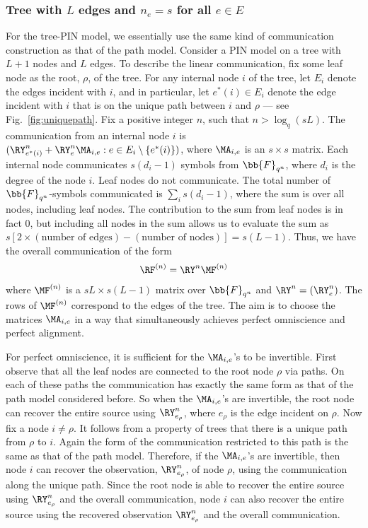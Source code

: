 \subsubsection{Tree with $L$ edges and $n_e=s$ for all $e \in E$}
For the tree-PIN model, we essentially use the same kind of communication construction as that of the path model.  Consider a PIN model on a tree with $L+1$ nodes and $L$ edges. To describe the linear communication, fix some leaf node as the root, $\rho$, of the tree. For any internal node $i$ of the tree, let $E_i$ denote the edges incident with $i$, and in particular, let $e^*(i)\in E_i$ denote the edge incident with $i$ that is on the unique path between $i$ and $\rho$ --- see Fig.~\ref{fig:uniquepath}. Fix a positive integer $n$,  such that $n > \log_q(sL)$. The communication from an internal node $i$ is  $(  \RY^n_{e^*(i)} + \RY^n_{e}\MA_{i,e}: e \in E_i \setminus \{e^*(i)\})$, where $\MA_{i,e}$ is an $s \times s$ matrix.  Each internal node communicates $s(d_i - 1)$ symbols from $\bb{F}_{q^n}$, where $d_i$ is the degree of the node $i$. Leaf nodes do not communicate. The total number of $\bb{F}_{q^n}$-symbols communicated is $\sum_i s(d_i-1)$, where the sum is over all nodes, including leaf nodes. The contribution to the sum from leaf nodes is in fact $0$, but including all nodes in the sum allows us to evaluate the sum as $s[2 \times(\text{number of edges}) - (\text{number of nodes})] = s(L-1)$.
 Thus, we have the overall communication of the form 
\begin{align*}
 \RF^{(n)} = \RY^n \MF^{(n)} 
\end{align*}
 where $\MF^{(n)} $ is a $sL \times s(L-1)$ matrix over $\bb{F}_{q^n}$ and $\RY^n = (\RY^n_e)$. The rows of $\MF^{(n)}$  correspond to the edges  of the tree.  The aim is to  choose the matrices $\MA_{i,e}$ in a way that simultaneously achieves perfect omniscience and perfect alignment.
 
For perfect omniscience,  it is sufficient for the $\MA_{i,e}$'s to be     invertible. First observe that all the leaf nodes are connected to  the root node $\rho$  via paths. On each of these paths the communication has exactly the same form as that of the path model considered before. So when the $\MA_{i,e}$'s are invertible, the root node can recover the entire source using  $\RY_{e_\rho}^n$, where $e_\rho$ is the edge incident on $\rho$. Now fix a node $i \neq \rho$.  It follows from a property of trees that there is a unique path from $\rho$ to $i$. Again the form of the communication restricted to this path is the same as that of the path model.
Therefore, if the $\MA_{i,e}$'s are invertible, then node $i$ can recover the observation, $\RY_{e_\rho}^n$, of node $\rho$, using the communication along the unique path. Since the root node is able to recover the entire source using $\RY_{e_\rho}^n$ and the overall communication, node $i$ can also recover the entire source using the recovered observation $\RY_{e_\rho}^n$ and the overall communication.  


